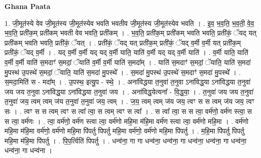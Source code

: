 \documentclass[17pt]{extarticle}
\begin{document}
\textbf{Ghana Paata } \newline

1. जी॒मूत॑स्ये वेव जी॒मूत॑स्य जी॒मूत॑स्येव भवति भवतीव जी॒मूत॑स्य जी॒मूत॑स्येव भवति । . इ॒व॒ भ॒व॒ति॒ भ॒व॒ती॒ वे॒व॒ भ॒व॒ति॒ प्रती॑क॒म् प्रती॑कम् भवती वेव भवति॒ प्रती॑कम् । . भ॒व॒ति॒ प्रती॑क॒म् प्रती॑कम् भवति भवति॒ प्रती॑कं॒ ॅयद् यत् प्रती॑कम् भवति भवति॒ प्रती॑कं॒ ॅयत् । . प्रती॑कं॒ ॅयद् यत् प्रती॑क॒म् प्रती॑कं॒ ॅयद् व॒र्मी व॒र्मी यत् प्रती॑क॒म् प्रती॑कं॒ ॅयद् व॒र्मी । . यद् व॒र्मी व॒र्मी यद् यद् व॒र्मी याति॒ याति॑ व॒र्मी यद् यद् व॒र्मी याति॑ । . व॒र्मी याति॒ याति॑ व॒र्मी व॒र्मी याति॑ स॒मदाꣳ॑ स॒मदां॒ ॅयाति॑ व॒र्मी व॒र्मी याति॑ स॒मदा᳚म् । . याति॑ स॒मदाꣳ॑ स॒मदां॒ ॅयाति॒ याति॑ स॒मदा॑ मु॒पस्थ॑ उ॒पस्थे॑ स॒मदां॒ ॅयाति॒ याति॑ स॒मदा॑ मु॒पस्थे᳚ । . स॒मदा॑ मु॒पस्थ॑ उ॒पस्थे॑ स॒मदाꣳ॑ स॒मदा॑ मु॒पस्थे᳚ । . स॒मदा॒मिति॑ स - मदा᳚म् । . उ॒पस्थ॒ इत्यु॒प - स्थे॒ । . अना॑विद्धया त॒नुवा॑ त॒नुवा ऽना॑विद्ध॒या ऽना॑विद्धया त॒नुवा॑ जय जय त॒नुवा ऽना॑विद्ध॒या ऽना॑विद्धया त॒नुवा॑ जय । . अना॑विद्ध॒येत्यना᳚ - वि॒द्ध॒या॒ । . त॒नुवा॑ जय जय त॒नुवा॑ त॒नुवा॑ जय॒ त्वम् त्वम् ज॑य त॒नुवा॑ त॒नुवा॑ जय॒ त्वम् । . ज॒य॒ त्वम् त्वम् ज॑य जय॒ त्वꣳ स स त्वम् ज॑य जय॒ त्वꣳ सः । . त्वꣳ स स त्वम् त्वꣳ स त्वा᳚ त्वा॒ स त्वम् त्वꣳ स त्वा᳚ । . स त्वा᳚ त्वा॒ स स त्वा॒ वर्म॑णो॒ वर्म॑ण स्त्वा॒ स स त्वा॒ वर्म॑णः । . त्वा॒ वर्म॑णो॒ वर्म॑ण स्त्वा त्वा॒ वर्म॑णो महि॒मा म॑हि॒मा वर्म॑ण स्त्वा त्वा॒ वर्म॑णो महि॒मा । . वर्म॑णो महि॒मा म॑हि॒मा वर्म॑णो॒ वर्म॑णो महि॒मा पि॑पर्तु पिपर्तु महि॒मा वर्म॑णो॒ वर्म॑णो महि॒मा पि॑पर्तु । . म॒हि॒मा पि॑पर्तु पिपर्तु महि॒मा म॑हि॒मा पि॑पर्तु । . पि॒प॒र्त्विति॑ पिपर्तु । . धन्व॑ना॒ गा गा धन्व॑ना॒ धन्व॑ना॒ गा धन्व॑ना॒ धन्व॑ना॒ गा धन्व॑ना॒ धन्व॑ना॒ गा धन्व॑ना । \newline
\end{document}
